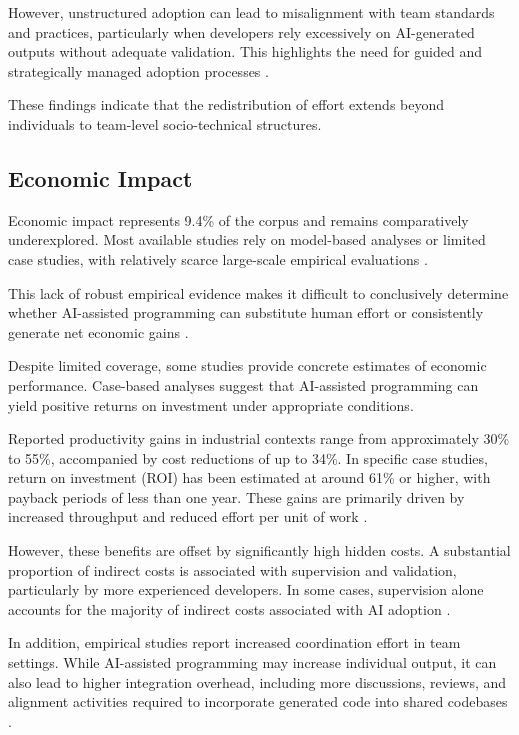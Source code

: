 \documentclass[conference]{IEEEtran}
\begin{document}
However, unstructured adoption can lead to misalignment with team standards and practices, particularly when developers rely excessively on AI-generated outputs without adequate validation. This highlights the need for guided and strategically managed adoption processes \cite{vasiliniuc_case_2023}.

These findings indicate that the redistribution of effort extends beyond individuals to team-level socio-technical structures.

\subsection{Economic Impact}

Economic impact represents 9.4\% of the corpus and remains comparatively underexplored. Most available studies rely on model-based analyses or limited case studies, with relatively scarce large-scale empirical evaluations \cite{rodriguez_comparative_2025}.

This lack of robust empirical evidence makes it difficult to conclusively determine whether AI-assisted programming can substitute human effort or consistently generate net economic gains \cite{nascimento_comparing_2023}.

Despite limited coverage, some studies provide concrete estimates of economic performance. Case-based analyses suggest that AI-assisted programming can yield positive returns on investment under appropriate conditions.

Reported productivity gains in industrial contexts range from approximately 30\% to 55\%, accompanied by cost reductions of up to 34\%. In specific case studies, return on investment (ROI) has been estimated at around 61\% or higher, with payback periods of less than one year. These gains are primarily driven by increased throughput and reduced effort per unit of work \cite{rodriguez_comparative_2025}.

However, these benefits are offset by significantly high hidden costs. A substantial proportion of indirect costs is associated with supervision and validation, particularly by more experienced developers. In some cases, supervision alone accounts for the majority of indirect costs associated with AI adoption \cite{rodriguez_comparative_2025}.

In addition, empirical studies report increased coordination effort in team settings. While AI-assisted programming may increase individual output, it can also lead to higher integration overhead, including more discussions, reviews, and alignment activities required to incorporate generated code into shared codebases \cite{song_impact_2024}.
\end{document}
